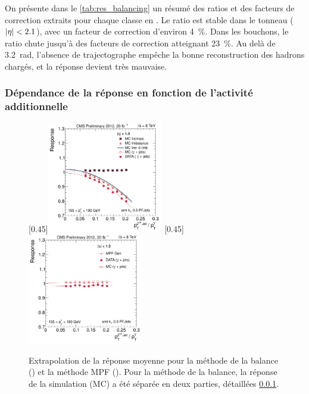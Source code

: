 \bigskip

On présente dans le \cref{tab:res_balancing} un résumé des ratios et des facteurs de correction extraits pour chaque classe en \aeta. Le ratio est stable dans le tonneau ($\lvert \eta \rvert < \num{2.1}$), avec un facteur de correction d'environ \SI{4}{\%}. Dans les bouchons, le ratio chute jusqu'à des facteurs de correction atteignant \SI{23}{\%}. Au delà de \SI{3.2}{\radian}, l'absence de trajectographe empêche la bonne reconstruction des hadrons chargés, et la réponse devient très mauvaise.

\subsubsection{Dépendance de la réponse en fonction de l'activité additionnelle} \label{sec:res_balancing_extrap}

\begin{figure}[tbp]
    \centering
    \subcaptionbox{\label{fig:extrap_balancing}}[0.45\textwidth]{\includegraphics[width=0.45\textwidth]{chapitre4/figs/extrap/response_eta013_ptPhot_155_180.pdf}}\hfill
    \subcaptionbox{\label{fig:extrap_mpf}}[0.45\textwidth]{\includegraphics[width=0.45\textwidth]{chapitre4/figs/extrap/responseMPF_eta013_ptPhot_155_180.pdf}}
    \caption{Extrapolation de la réponse moyenne pour la méthode de la balance () et la méthode MPF (). Pour la méthode de la balance, la réponse de la simulation (MC) a été séparée en deux parties, détaillées \cref{sec:res_balancing_extrap}.}
\end{figure}


